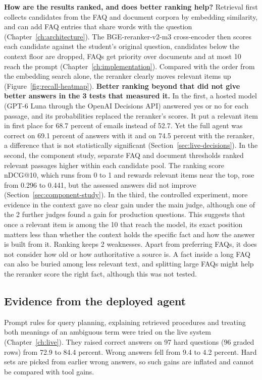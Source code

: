 \textbf{How are the results ranked, and does better ranking help?} Retrieval first collects candidates from the FAQ and document corpora by embedding similarity, and can add FAQ entries that share words with the question (Chapter~\ref{ch:architecture}). The BGE-reranker-v2-m3 cross-encoder then scores each candidate against the student's original question, candidates below the context floor are dropped, FAQs get priority over documents and at most 10 reach the prompt (Chapter~\ref{ch:implementation}). Compared with the order from the embedding search alone, the reranker clearly moves relevant items up (Figure~\ref{fig:recall-heatmap}). \textbf{Better ranking beyond that did not give better answers in the 3 tests that measured it.} In the first, a hosted model (GPT-6 Luna through the OpenAI Decisions API) answered yes or no for each passage, and its probabilities replaced the reranker's scores. It put a relevant item in first place for 68.7 percent of emails instead of 52.7. Yet the full agent was correct on 69.1 percent of answers with it and on 74.5 percent with the reranker, a difference that is not statistically significant (Section~\ref{sec:live-decisions}). In the second, the component study, separate FAQ and document thresholds ranked relevant passages higher within each candidate pool. The ranking score nDCG@10, which runs from 0 to 1 and rewards relevant items near the top, rose from 0.296 to 0.441, but the assessed answers did not improve (Section~\ref{sec:component-study}). In the third, the controlled experiment, more evidence in the context gave no clear gain under the main judge, although one of the 2 further judges found a gain for production questions. This suggests that once a relevant item is among the 10 that reach the model, its exact position matters less than whether the context holds the specific fact and how the answer is built from it. Ranking keeps 2 weaknesses. Apart from preferring FAQs, it does not consider how old or how authoritative a source is. A fact inside a long FAQ can also be buried among less relevant text, and splitting large FAQs might help the reranker score the right fact, although this was not tested.

\subsection{Evidence from the deployed agent}

Prompt rules for query planning, explaining retrieved procedures and treating both meanings of an ambiguous term were tried on the live system (Chapter~\ref{ch:live}). They raised correct answers on 97 hard questions (96 graded rows) from 72.9 to 84.4 percent. Wrong answers fell from 9.4 to 4.2 percent. Hard sets are picked from earlier wrong answers, so such gains are inflated and cannot be compared with tool gains.

